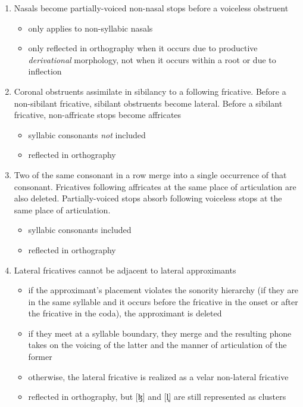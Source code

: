 \documentclass[10pt]{article}
\newcommand{\chris}[1]{{\Charis #1}}
\newcommand{\phipa}[1]{[\chris{#1}]}
\newcommand{\latfrivoic}{ɮ}
\newcommand{\vless}{̥}
\begin{document}
\begin{enumerate}
\begin{itemize}
    \end{itemize}
    \item Nasals become partially-voiced non-nasal stops before a voiceless obstruent
    \begin{itemize}
        \item only applies to non-syllabic nasals
        \item only reflected in orthography when it occurs due to productive \emph{derivational} morphology, not when it occurs within a root or due to inflection
    \end{itemize}
    \item Coronal obstruents assimilate in sibilancy to a following fricative. Before a non-sibilant fricative, sibilant obstruents become lateral. Before a sibilant fricative, non-affricate stops become affricates
    \begin{itemize}
        \item syllabic consonants \emph{not} included
        \item reflected in orthography
    \end{itemize}
    \item Two of the same consonant in a row merge into a single occurrence of that consonant. Fricatives following affricates at the same place of articulation are also deleted. Partially-voiced stops absorb following voiceless stops at the same place of articulation.
    \begin{itemize}
        \item syllabic consonants included
        \item reflected in orthography
    \end{itemize}
    \item Lateral fricatives cannot be adjacent to lateral approximants
    \begin{itemize}
        \item if the approximant's placement violates the sonority hierarchy (if they are in the same syllable and it occurs before the fricative in the onset or after the fricative in the coda), the approximant is deleted
        \item if they meet at a syllable boundary, they merge and the resulting phone takes on the voicing of the latter and the manner of articulation of the former
        \item otherwise, the lateral fricative is realized as a velar non-lateral fricative
        \item reflected in orthography, but \phipa{\latfrivoic} and \phipa{l\vless} are still represented as clusters
    \end{itemize}
\end{enumerate}
\end{document}
